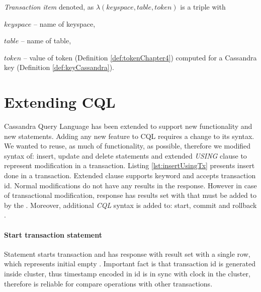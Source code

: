 \begin{definition}
\label{def:transactionItemChapter4}
\emph{Transaction item} denoted, as $\lambda(\mathit{keyspace}, \mathit{table}, \mathit{token})$ is a triple with \begin{enumerate*}
\item $\mathit{keyspace}$ -- name of keyspace,
\item $\mathit{table}$ -- name of table,
\item $\mathit{token}$ -- value of token (Definition \ref{def:tokenChapter4}) computed for a Cassandra key (Definition \ref{def:keyCassandra}).
\end{enumerate*}
\end{definition}






\section{Extending CQL}
Cassandra Query Language has been extended to support new functionality and new statements. Adding any new feature to CQL requires a change to its syntax. We wanted to reuse, as much of functionality, as possible, therefore we modified syntax of: insert, update and delete statements and extended \emph{USING} clause to represent modification in a transaction. Listing \ref{lst:insertUsingTx} presents insert done in a transaction. Extended  clause supports  keyword and accepts transaction id. Normal modifications do not have any results in the response. However in case of transactional modification, response has results set with \txItem that must be added to \txState by the \client. Moreover, additional \emph{CQL} syntax is added to: start, commit and rollback \transaction.

\paragraph{Start transaction statement} 
Statement starts transaction and has response with result set with a single row, which represents initial empty \txState. 
 Important fact is that transaction id is generated inside cluster, thus timestamp encoded in id is in sync with clock in the cluster, therefore is reliable for compare operations with other transactions.

